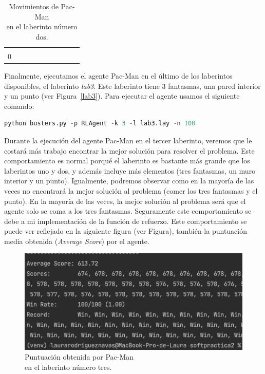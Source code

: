 \documentclass[11pt]{exam}
\begin{document}
\begin{table}[H]
\begin{tabular}{cccccccccc}
		\multicolumn{1}{c|}{} &
		\multicolumn{1}{c|}{} &
		\multicolumn{1}{c|}{} &
		\multicolumn{1}{c|}{} &
		\multicolumn{1}{c|}{} &
		\cellcolor[HTML]{000000} \\ \cline{2-9}
		\multicolumn{1}{c|}{0} &
		\multicolumn{1}{c|}{\cellcolor[HTML]{000000}} &
		\multicolumn{1}{c|}{\cellcolor[HTML]{000000}} &
		\multicolumn{1}{c|}{\cellcolor[HTML]{000000}} &
		\multicolumn{1}{c|}{\cellcolor[HTML]{000000}} &
		\multicolumn{1}{c|}{\cellcolor[HTML]{000000}} &
		\multicolumn{1}{c|}{\cellcolor[HTML]{000000}} &
		\multicolumn{1}{c|}{\cellcolor[HTML]{000000}} &
		\multicolumn{1}{c|}{\cellcolor[HTML]{000000}} &
		\cellcolor[HTML]{000000} \\ \cline{2-9}
	\end{tabular}
	\caption{Movimientos de Pac-Man \\ en el laberinto número dos.}
	\label{tabla_lab2}
\end{table}

Finalmente, ejecutamos el agente Pac-Man en el último de los laberintos disponibles, el laberinto \textit{lab3}. Este laberinto tiene 3 fantasmas, una pared interior y un punto (ver Figura~\ref{lab3}). Para ejecutar el agente usamos el siguiente comando:

\begin{lstlisting}[language=python, basicstyle=\footnotesize]
python busters.py -p RLAgent -k 3 -l lab3.lay -n 100
\end{lstlisting}

Durante la ejecución del agente Pac-Man en el tercer laberinto, veremos que le costará más trabajo encontrar la mejor solución para resolver el problema. Este comportamiento es normal porqué el laberinto es bastante más grande que los laberintos uno y dos, y además incluye más elementos (tres fantasmas, un muro interior y un punto). Igualmente, podremos observar como en la mayoría de las veces no encontrará la mejor solución al problema (comer los tres fantasmas y el punto). En la mayoría de las veces, la mejor solución al problema será que el agente solo se coma a los tres fantasmas. Seguramente este comportamiento se debe a mi implementación de la función de refuerzo. Este comportamiento se puede ver reflejado en la siguiente figura (ver Figura), también la puntuación media obtenida (\textit{Average Score}) por el agente.

\begin{figure}[H]
	\centering
	\includegraphics[scale=0.6]{result_lab3}
	\caption{Puntuación obtenida por Pac-Man \\ en el laberinto número tres.}
	\label{result_lab3}
\end{figure}
\end{document}

